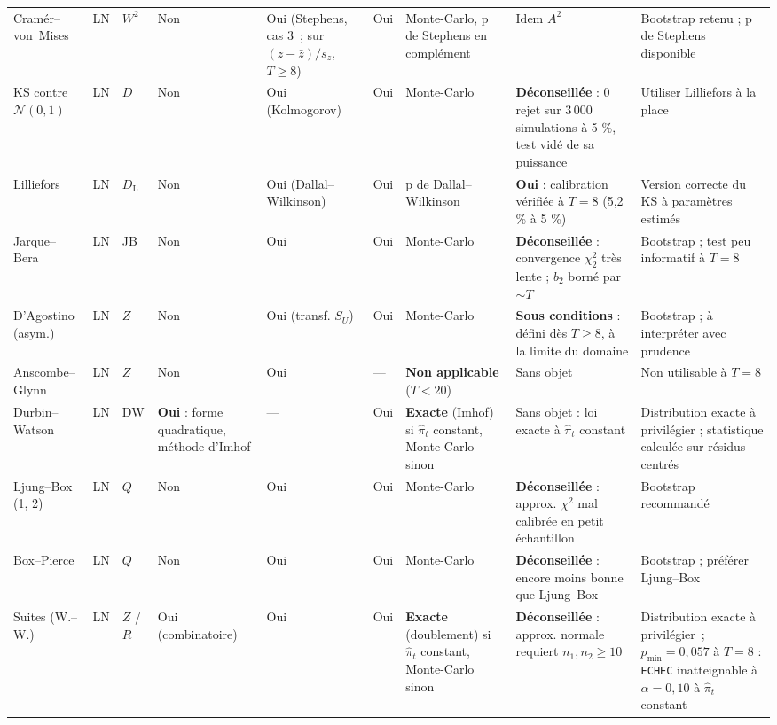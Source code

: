\documentclass[a4paper,11pt]{article}
\newcommand{\code}[1]{\texttt{\small #1}}
\begin{document}
\begin{landscape}
\begin{center}
\begin{longtable}{@{}p{2.9cm}p{1.5cm}p{1.1cm}p{1.3cm}p{1.3cm}p{1.3cm}p{2.7cm}p{4.7cm}p{4.1cm}@{}}
Cramér--von~Mises & LN & $W^2$ & Non & Oui (Stephens, cas 3~; sur
$(z-\bar z)/s_z$, $T \ge 8$) & Oui &
Monte-Carlo, p de Stephens en complément & Idem $A^2$ &
Bootstrap retenu ; p de Stephens disponible \\

KS contre $\mathcal{N}(0,1)$ & LN & $D$ & Non & Oui (Kolmogorov) & Oui & Monte-Carlo &
\textbf{Déconseillée} : 0 rejet sur 3\,000 simulations à 5 \%, test vidé de sa puissance &
Utiliser Lilliefors à la place \\

Lilliefors & LN & $D_{\mathrm{L}}$ & Non & Oui (Dallal--Wilkinson) & Oui &
p de Dallal--Wilkinson & \textbf{Oui} : calibration vérifiée à $T=8$ (5,2 \% à 5 \%) &
Version correcte du KS à paramètres estimés \\

Jarque--Bera & LN & JB & Non & Oui & Oui & Monte-Carlo &
\textbf{Déconseillée} : convergence $\chi^2_2$ très lente ; $b_2$ borné par
$\sim T$ & Bootstrap ; test peu informatif à $T=8$ \\

D'Agostino (asym.) & LN & $Z$ & Non & Oui (transf. $S_U$) & Oui & Monte-Carlo &
\textbf{Sous conditions} : défini dès $T\ge 8$, à la limite du domaine &
Bootstrap ; à interpréter avec prudence \\

Anscombe--Glynn & LN & $Z$ & Non & Oui & --- & \textbf{Non applicable} ($T<20$) &
Sans objet & Non utilisable à $T=8$ \\

Durbin--Watson & LN & DW & \textbf{Oui} : forme quadratique, méthode d'Imhof & --- & Oui &
\textbf{Exacte} (Imhof) si $\hat\pi_t$ constant, Monte-Carlo sinon & Sans objet : loi
exacte à $\hat\pi_t$ constant &
Distribution exacte à privilégier ; statistique calculée sur résidus centrés \\

Ljung--Box (1, 2) & LN & $Q$ & Non & Oui & Oui & Monte-Carlo &
\textbf{Déconseillée} : approx. $\chi^2$ mal calibrée en petit échantillon &
Bootstrap recommandé \\

Box--Pierce & LN & $Q$ & Non & Oui & Oui & Monte-Carlo &
\textbf{Déconseillée} : encore moins bonne que Ljung--Box &
Bootstrap ; préférer Ljung--Box \\

Suites (W.--W.) & LN & $Z$ / $R$ & Oui (combinatoire) & Oui & Oui & \textbf{Exacte}
(doublement) si $\hat\pi_t$ constant, Monte-Carlo sinon &
\textbf{Déconseillée} : approx. normale requiert $n_1,n_2\ge 10$ &
Distribution exacte à privilégier~; $p_{\min} = 0{,}057$ à $T = 8$ : \code{ECHEC}
inatteignable à $\alpha = 0{,}10$ à $\hat\pi_t$ constant \\


\end{longtable}
\end{center}
\end{landscape}
\end{document}
